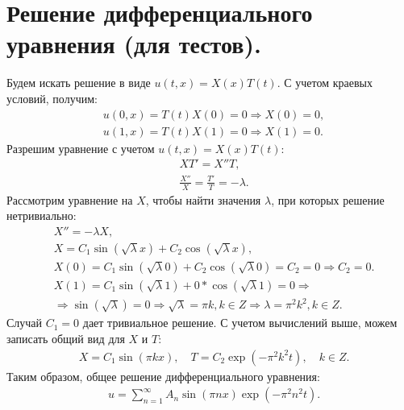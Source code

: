 \documentclass[14pt,a4paper]{extarticle}
\newcommand{\1}{\mathbbm{1}}
\begin{document}
\section{Решение дифференциального уравнения (для тестов).}\label{solution}
Будем искать решение в виде $u(t, x) = X(x) T(t)$. С учетом краевых условий, получим:
\begin{align*} 
    & u(0, x) = T(t) X(0) = 0 \Rightarrow X(0) = 0, \\
    & u(1, x) = T(t) X(1) = 0 \Rightarrow X(1) = 0.
\end{align*}
Разрешим уравнение с учетом $u(t, x) = X(x) T(t)$:
\begin{align*} 
    & X T' = X'' T, \\
    & \frac{X''}{X} = \frac{T'}{T} = -\lambda.
\end{align*}
Рассмотрим уравнение на $X$, чтобы найти значения $\lambda$, при которых решение нетривиально:
\begin{align*} 
    & X'' = -\lambda X, \\
    & X = C_1 \sin(\sqrt{\lambda} x) + C_2 \cos (\sqrt{\lambda} x), \\
    & X(0) = C_1 \sin(\sqrt{\lambda} 0) + C_2 \cos (\sqrt{\lambda} 0) = C_2 = 0 \Rightarrow C_2 = 0. \\
    & X(1) = C_1 \sin(\sqrt{\lambda} 1) + 0 * \cos (\sqrt{\lambda} 1)= 0 \Rightarrow \\ 
    & \Rightarrow \sin(\sqrt{\lambda}) = 0 \Rightarrow \sqrt{\lambda} = \pi k, k \in Z \Rightarrow \lambda = \pi^2 k^2, k \in Z.
\end{align*}
Случай $C_1 = 0$ дает тривиальное решение. С учетом вычислений выше, можем записать общий вид для $X$ и $T$:
\begin{align*} 
    & X = C_1 \sin(\pi k x), \quad T = C_2 \exp{(-\pi^2 k^2 t)}, \quad k \in Z.
\end{align*}
Таким образом, общее решение дифференциального уравнения:
\begin{align*} 
    & u = \sum_{n = 1}^{\infty} A_n \sin(\pi n x) \exp{(-\pi^2 n^2 t)}.
\end{align*}
\end{document}
